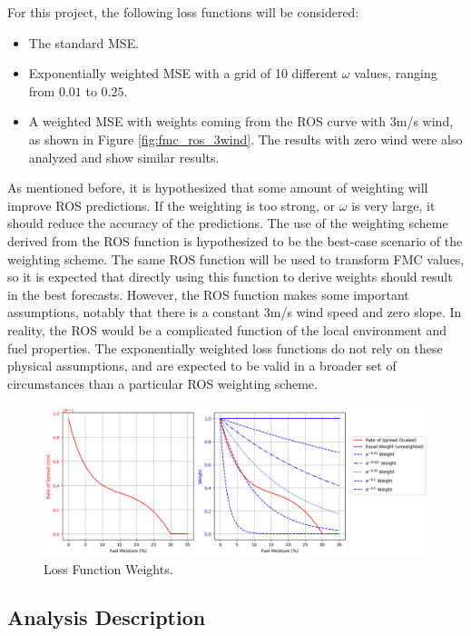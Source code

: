 \documentclass[11pt]{article}%
\begin{document}
For this project, the following loss functions will be considered:

\begin{itemize}
    \item The standard MSE.
    \item Exponentially weighted MSE with a grid of 10 different $\omega$ values, ranging from $0.01$ to $0.25$.
    \item A weighted MSE with weights coming from the ROS curve with 3m/s wind, as shown in Figure \ref{fig:fmc_ros_3wind}. The results with zero wind were also analyzed and show similar results.
\end{itemize}

As mentioned before, it is hypothesized that some amount of weighting will improve ROS predictions. If the weighting is too strong, or $\omega$ is very large, it should reduce the accuracy of the predictions. The use of the weighting scheme derived from the ROS function is hypothesized to be the best-case scenario of the weighting scheme. The same ROS function will be used to transform FMC values, so it is expected that directly using this function to derive weights should result in the best forecasts. However, the ROS function makes some important assumptions, notably that there is a constant 3m/s wind speed and zero slope. In reality, the ROS would be a complicated function of the local environment and fuel properties. The exponentially weighted loss functions do not rely on these physical assumptions, and are expected to be valid in a broader set of circumstances than a particular ROS weighting scheme.

\begin{figure}[ht]
    \centering
    \includegraphics[width=1.1\textwidth]{images/weights.png}
    \caption{Loss Function Weights.}
    \label{fig:weights}
\end{figure}

\subsection{Analysis Description}
\end{document}
